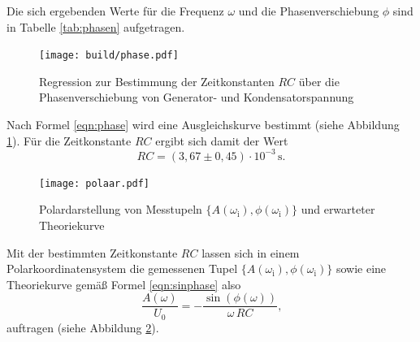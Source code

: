 Die sich ergebenden Werte für die Frequenz $\omega$ und die Phasenverschiebung $\phi$ sind in Tabelle \ref{tab:phasen} aufgetragen.
\begin{figure}
	\centering
	\texttt{[image: build/phase.pdf]}
	\caption{Regression zur Bestimmung der Zeitkonstanten $RC$ über die Phasenverschiebung von Generator- und Kondensatorspannung}
	\label{fig:phasi}
\end{figure}
Nach Formel \eqref{eqn:phase} wird eine Ausgleichskurve bestimmt (siehe Abbildung \ref{fig:phasi}).
Für die Zeitkonstante $RC$ ergibt sich damit der Wert
\begin{equation*}
	RC = (3,67 \pm 0,45) \cdot 10^{-3} \, \si{\second} .
\end{equation*}

\begin{figure}
	\centering
	\texttt{[image: polaar.pdf]}
	\caption{Polardarstellung von Messtupeln $\{A(\omega_{\text{i}}), \phi(\omega_{\text{i}}) \}$ und erwarteter Theoriekurve}
	\label{fig:polari}
\end{figure}

Mit der bestimmten Zeitkonstante $RC$ lassen sich in einem Polarkoordinatensystem die gemessenen Tupel $\{A(\omega_{\text{i}}), \phi(\omega_{\text{i}}) \}$ sowie eine Theoriekurve gemäß Formel \eqref{eqn:sinphase} also
\begin{equation}
	\frac{A({\omega})}{U_0} = - \frac{\sin(\phi(\omega))}{\omega \, RC} \text{,}
\end{equation}
auftragen (siehe Abbildung \ref{fig:polari}).

